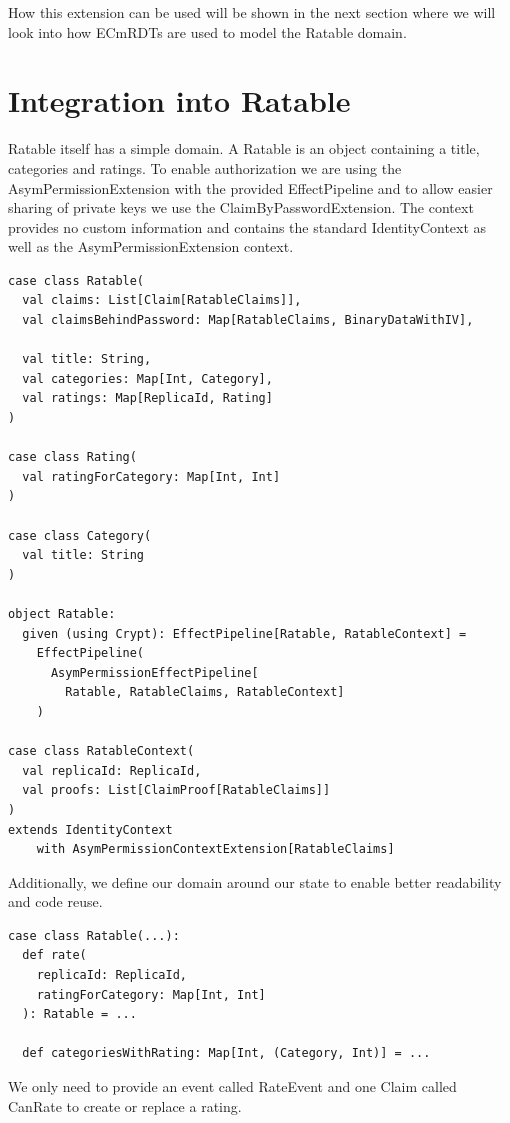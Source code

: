 \documentclass[
	ngerman,
	ruledheaders=section,   %
	class=report,		    %
	thesis={type=bachelor}, %
	accentcolor=9c,			%
	custommargins=true,    %
	marginpar=false,        %
	parskip=half-,          %
	fontsize=11pt,          %
]{tudapub}
\begin{document}
How this extension can be used will be shown in the next section where we will look into how ECmRDTs are used to model the Ratable domain.

\section{Integration into Ratable}
Ratable itself has a simple domain. A Ratable is an object containing a title, categories and ratings. To enable authorization we are using the AsymPermissionExtension with the provided EffectPipeline and to allow easier sharing of private keys we use the ClaimByPasswordExtension. The context provides no custom information and contains the standard IdentityContext as well as the AsymPermissionExtension context.

\begin{lstlisting}
case class Ratable(
  val claims: List[Claim[RatableClaims]],
  val claimsBehindPassword: Map[RatableClaims, BinaryDataWithIV],

  val title: String,
  val categories: Map[Int, Category],
  val ratings: Map[ReplicaId, Rating]
)

case class Rating(
  val ratingForCategory: Map[Int, Int]
)

case class Category(
  val title: String
)

object Ratable:
  given (using Crypt): EffectPipeline[Ratable, RatableContext] = 
    EffectPipeline(
      AsymPermissionEffectPipeline[
        Ratable, RatableClaims, RatableContext]
    )

case class RatableContext(
  val replicaId: ReplicaId,
  val proofs: List[ClaimProof[RatableClaims]]
) 
extends IdentityContext 
    with AsymPermissionContextExtension[RatableClaims]
\end{lstlisting}

Additionally, we define our domain around our state to enable better readability and code reuse.

\begin{lstlisting}
case class Ratable(...):
  def rate(
    replicaId: ReplicaId, 
    ratingForCategory: Map[Int, Int]
  ): Ratable = ...

  def categoriesWithRating: Map[Int, (Category, Int)] = ...
\end{lstlisting}

We only need to provide an event called RateEvent and one Claim called CanRate to create or replace a rating.
\end{document}
